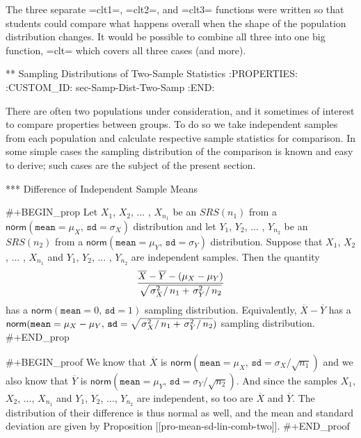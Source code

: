 The three separate =clt1=, =clt2=, and =clt3= functions were written
so that students could compare what happens overall when the shape of
the population distribution changes. It would be possible to combine
all three into one big function, =clt= which covers all three cases
(and more).

** Sampling Distributions of Two-Sample Statistics
:PROPERTIES:
:CUSTOM_ID: sec-Samp-Dist-Two-Samp
:END:

There are often two populations under consideration, and it sometimes
of interest to compare properties between groups. To do so we take
independent samples from each population and calculate respective
sample statistics for comparison. In some simple cases the sampling
distribution of the comparison is known and easy to derive; such cases
are the subject of the present section.

*** Difference of Independent Sample Means

#+BEGIN_prop
Let \(X_{1}\), \(X_{2}\), ... , \(X_{n_{1}}\) be an \(SRS(n_{1})\)
from a
\(\mathsf{norm}(\mathtt{mean}=\mu_{X},\,\mathtt{sd}=\sigma_{X})\)
distribution and let \(Y_{1}\), \(Y_{2}\), ... , \(Y_{n_{2}}\) be an
\(SRS(n_{2})\) from a
\(\mathsf{norm}(\mathtt{mean}=\mu_{Y},\,\mathtt{sd}=\sigma_{Y})\)
distribution. Suppose that \(X_{1}\), \(X_{2}\), ... , \(X_{n_{1}}\)
and \(Y_{1}\), \(Y_{2}\), ... , \(Y_{n_{2}}\) are independent
samples. Then the quantity
\begin{equation}
\label{eq-diff-indep-sample-means}
\frac{\overline{X}-\overline{Y}-(\mu_{X}-\mu_{Y})}{\sqrt{\left.\sigma_{X}^{2}\right/ n_{1}+\left.\sigma_{Y}^{2}\right/ n_{2}}}
\end{equation}
has a \(\mathsf{norm}(\mathtt{mean}=0,\,\mathtt{sd}=1)\) sampling
distribution. Equivalently, \(\overline{X}-\overline{Y}\) has a
\(\mathsf{norm}(\mathtt{mean}=\mu_{X}-\mu_{Y},\,\mathtt{sd}=\sqrt{\left.\sigma_{X}^{2}\right/
n_{1}+\left.\sigma_{Y}^{2}\right/ n_{2}})\) sampling distribution.
#+END_prop

#+BEGIN_proof
We know that \(\overline{X}\) is
\(\mathsf{norm}(\mathtt{mean}=\mu_{X},\,\mathtt{sd}=\sigma_{X}/\sqrt{n_{1}})\)
and we also know that \(\overline{Y}\) is
\(\mathsf{norm}(\mathtt{mean}=\mu_{Y},\,\mathtt{sd}=\sigma_{Y}/\sqrt{n_{2}})\). And
since the samples \(X_{1}\), \(X_{2}\), ..., \(X_{n_{1}}\) and
\(Y_{1}\), \(Y_{2}\), ..., \(Y_{n_{2}}\) are independent, so too are
\(\overline{X}\) and \(\overline{Y}\). The distribution of their
difference is thus normal as well, and the mean and standard deviation
are given by Proposition [[pro-mean-sd-lin-comb-two]].
#+END_proof

